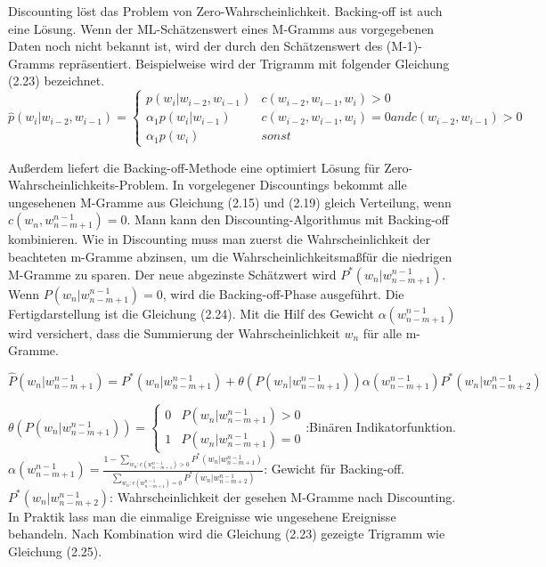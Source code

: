 Discounting l\"ost das Problem von Zero-Wahrscheinlichkeit. Backing-off ist auch eine L\"osung. Wenn der ML-Sch\"atzenswert eines M-Gramms aus vorgegebenen Daten noch nicht bekannt ist, wird der durch den Sch\"atzenswert des (M-1)-Gramms repr\"asentiert. Beispielweise wird der Trigramm mit folgender Gleichung (2.23) bezeichnet.
\begin{equation}
\label{equation:backing_off_01}
	\hat{p}(w_{i}|w_{i-2},w_{i-1})=
	\begin{cases}
			p(w_{i}|w_{i-2},w_{i-1}) & c(w_{i-2},w_{i-1},w_{i})>0 \\
			\alpha_{1}p(w_{i}|w_{i-1})& c(w_{i-2},w_{i-1},w_{i})=0 and c(w_{i-2},w_{i-1})>0 \\
			\alpha_{1}p(w_{i}) & sonst 
	\end{cases}
\end{equation}

Au\ss erdem liefert die Backing-off-Methode eine optimiert L\"osung f\"ur Zero-Wahrscheinlichkeits-Problem. In vorgelegener Discountings bekommt alle ungesehenen M-Gramme aus Gleichung (2.15) und (2.19) gleich Verteilung, wenn $c(w_{n},w_{n-m+1}^{n-1})=0$. Mann kann den Discounting-Algorithmus mit Backing-off kombinieren. Wie in Discounting muss man zuerst die Wahrscheinlichkeit der beachteten m-Gramme abzinsen, um die Wahrscheinlichkeitsma\ss f\"ur die niedrigen M-Gramme zu sparen. Der neue  abgezinste Sch\"atzwert wird $P^{*}(w_{n}|w_{n-m+1}^{n-1})$. Wenn $P(w_{n}|w_{n-m+1}^{n-1})=0$, wird die Backing-off-Phase ausgef\"uhrt.  Die Fertigdarstellung ist die Gleichung (2.24).  Mit die Hilf des Gewicht $\alpha(w_{n-m+1}^{n-1})$ wird versichert, dass die Summierung der Wahrscheinlichkeit $w_{n}$ f\"ur alle m-Gramme.

\begin{equation}
\label{equation:backing_off_02}
\hat{P}(w_{n}|w_{n-m+1}^{n-1})=P^{*}(w_{n}|w_{n-m+1}^{n-1})+\theta(P(w_{n}|w_{n-m+1}^{n-1}))\alpha(w_{n-m+1}^{n-1})P^{*}(w_{n}|w_{n-m+2}^{n-1})
\end{equation}

$\theta(P(w_{n}|w_{n-m+1}^{n-1}))=\begin{cases} 0 & P(w_{n}|w_{n-m+1}^{n-1})>0 \\ 1 & P(w_{n}|w_{n-m+1}^{n-1})= 0 \end{cases}$:Bin\"aren Indikatorfunktion.\\
$\alpha(w_{n-m+1}^{n-1})=\frac{1-\sum_{w_{n}:c(w_{n-m+1}^{n-1})>0}P^{*}(w_{n}|w_{n-m+1}^{n-1})}{\sum_{w_{n}:c(w_{n-m+1}^{n-1})=0}P^{*}(w_{n}|w_{n-m+2}^{n-1})}$: Gewicht f\"ur Backing-off.\\
$P^{*}(w_{n}|w_{n-m+2}^{n-1})$: Wahrscheinlichkeit der gesehen M-Gramme nach Discounting.\\
In Praktik lass man die einmalige Ereignisse wie ungesehene Ereignisse behandeln. Nach Kombination wird die Gleichung (2.23) gezeigte Trigramm wie Gleichung (2.25).

